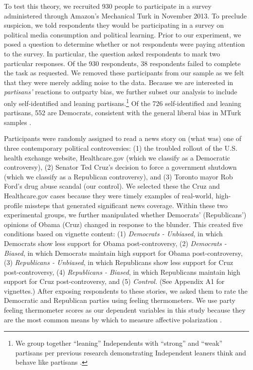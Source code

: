 \documentclass[12pt, letterpaper]{article}
\begin{document}
To test this theory, we recruited 930 people to participate in a survey administered through Amazon's Mechanical Turk in November 2013. To preclude suspicion, we told respondents they would be participating in a survey on political media consumption and political learning. Prior to our experiment, we posed a question to determine whether or not respondents were paying attention to the survey. In particular, the question asked respondents to mark two particular responses. Of the 930 respondents, 38 respondents failed to complete the task as requested. We removed these participants from our sample as we felt that they were merely adding noise to the data. Because we are interested in \textit{partisans'} reactions to outparty bias, we further subset our analysis to include only self-identified and leaning partisans.\footnote{We group together ``leaning'' Independents with ``strong'' and ``weak'' partisans per previous research demonstrating Independent leaners think and behave like partisans \citep{keithetal_1992}.} Of the 726 self-identified and leaning partisans, 552 are Democrats, consistent with the general liberal bias in MTurk samples \citep{BerinskyHuberLenz2012}. 

Participants were randomly assigned to read a news story on (what was) one of three contemporary political controversies: (1) the troubled rollout of the U.S. health exchange website, Healthcare.gov (which we classify as a Democratic controversy), (2) Senator Ted Cruz's decision to force a government shutdown (which we classify as a Republican controversy), and (3) Toronto mayor Rob Ford's drug abuse scandal (our control). We selected these the Cruz and Healthcare.gov cases because they were timely examples of real-world, high-profile missteps that generated significant news coverage. Within these two experimental groups, we further manipulated whether Democrats' (Republicans') opinions of Obama (Cruz) changed in response to the blunder. This created five conditions based on vignette content:  (1) \textit{Democrats - Unbiased}, in which Democrats show less support for Obama post-controversy, (2) \textit{Democrats - Biased}, in which Democrats maintain high support for Obama post-controversy, (3) \textit{Republicans - Unbiased}, in which Republicans show less support for Cruz post-controversy, (4) \textit{Republicans - Biased}, in which Republicans maintain high support for Cruz post-controversy, and (5) \textit{Control.} (See Appendix A1 for vignettes.) After exposing respondents to these stories, we asked them to rate the Democratic and Republican parties using feeling thermometers. We use party feeling thermometer scores as our dependent variables in this study because they are the most common means by which to measure affective polarization \citep[e.g.,][]{haidthetherington_2012,hetheringtonrudolph_2015,IyengarSoodLelkes2012,iyengarwestwood_2014,mason_2015}. 
\end{document}
